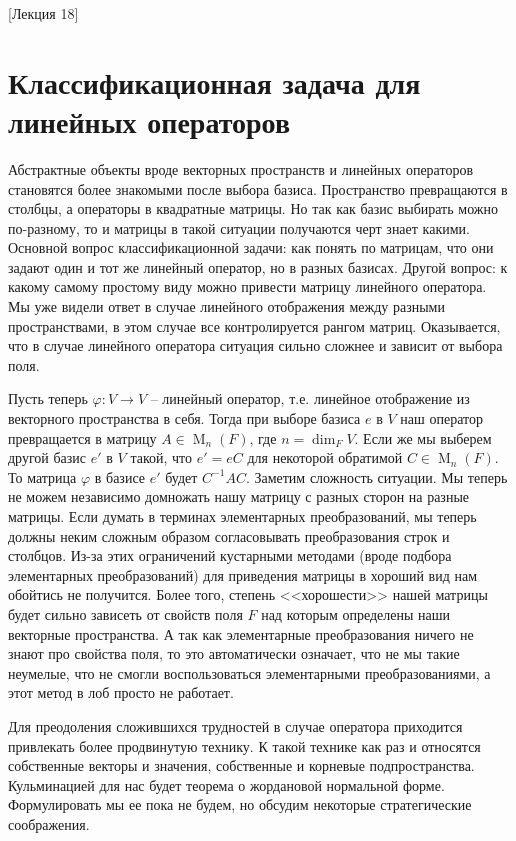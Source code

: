 [Лекция 18]


\newpage
\section{Классификационная задача для линейных операторов}

Абстрактные объекты вроде векторных пространств и линейных операторов становятся более знакомыми после выбора базиса.
Пространство превращаются в столбцы, а операторы в квадратные матрицы.
Но так как базис выбирать можно по-разному, то и матрицы в такой ситуации получаются черт знает какими.
Основной вопрос классификационной задачи: как понять по матрицам, что они задают один и тот же линейный оператор, но в разных базисах.
Другой вопрос: к какому самому простому виду можно привести матрицу линейного оператора.
Мы уже видели ответ в случае линейного отображения между разными пространствами, в этом случае все контролируется рангом матриц.
Оказывается, что в случае линейного оператора ситуация сильно сложнее и зависит от выбора поля.

Пусть теперь $\varphi\colon V\to V$ -- линейный оператор, т.е. линейное отображение из векторного пространства в себя.
Тогда при выборе базиса $e$ в $V$ наш оператор превращается в матрицу $A\in \operatorname{M}_n(F)$, где $n = \dim_F V$.
Если же мы выберем другой базис $e'$ в $V$ такой, что $e' = eC$ для некоторой обратимой $C \in \operatorname{M}_n(F)$.
То матрица $\varphi$ в базисе $e'$ будет $C^{-1}AC$.
Заметим сложность ситуации.
Мы теперь не можем независимо домножать нашу матрицу с разных сторон на разные матрицы.
Если думать в терминах элементарных преобразований, мы теперь должны неким сложным образом согласовывать преобразования строк и столбцов.
Из-за этих ограничений кустарными методами (вроде подбора элементарных преобразований) для приведения матрицы в хороший вид нам обойтись не получится.
Более того, степень <<хорошести>> нашей матрицы будет сильно зависеть от свойств поля $F$ над которым определены наши векторные пространства.
А так как элементарные преобразования ничего не знают про свойства поля, то это автоматически означает, что не мы такие неумелые, что не смогли воспользоваться элементарными преобразованиями, а этот метод в лоб просто не работает.

Для преодоления сложившихся трудностей в случае оператора приходится привлекать более продвинутую технику.
К такой технике как раз и относятся собственные векторы и значения, собственные и корневые подпространства.
Кульминацией для нас будет теорема о жордановой нормальной форме.
Формулировать мы ее пока не будем, но обсудим некоторые стратегические соображения.

